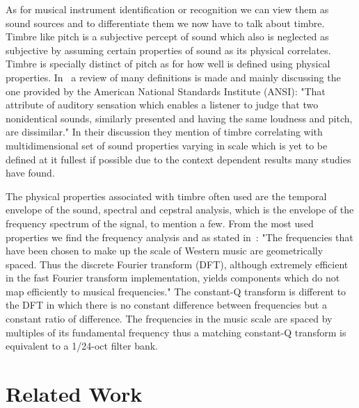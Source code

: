 \documentclass{article}
\begin{document}
As for musical instrument identification or recognition we can view them as sound sources and to differentiate them we now have to talk about timbre. Timbre like pitch is a subjective percept of sound which also is neglected as subjective by assuming certain properties of sound as its physical correlates. Timbre is specially distinct of pitch as for how well is defined using physical properties. In~\cite{siedenburg_timbre_2019} a review of many definitions is made and mainly discussing the one provided by the American National
Standards Institute (ANSI): "That attribute of auditory sensation which enables a listener to judge that two nonidentical sounds, similarly presented and having the same loudness and pitch, are dissimilar."
In their discussion they mention of timbre correlating with multidimensional set of sound properties varying in scale which is yet to be defined at it fullest if possible due to the context dependent results many studies have found.

The physical properties associated with timbre often used are the temporal envelope of the sound, spectral and cepstral analysis, which is the envelope of the frequency spectrum of the signal, to mention a few.
From the most used properties we find the frequency analysis and as stated in~\cite{brown_calculation_1991}:
"The frequencies that have been chosen to make up the scale of Western music are geometrically spaced. Thus the discrete Fourier transform (DFT), although extremely efficient in the fast Fourier transform implementation, yields components which do not map efficiently to musical frequencies."
The constant-Q transform is different to the DFT in which there is no constant difference between frequencies but a constant ratio of difference. The frequencies in the music scale are spaced by multiples of its fundamental frequency thus a matching constant-Q transform is equivalent to a 1/24-oct filter bank.

\section{Related Work}\label{sec:footnotes}
\end{document}

